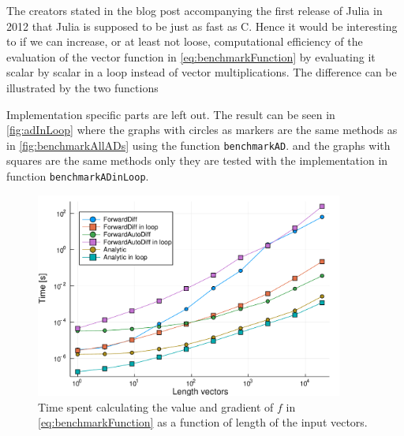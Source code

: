 The creators stated in the blog post accompanying the first release of Julia in 2012 \emph{\citep{juliaBlogRelease2012}} that Julia is supposed to be just as fast as C. Hence it would be interesting to if we can increase, or at least not loose, computational efficiency of the evaluation of the vector function in \eqref{eq:benchmarkFunction} by evaluating it scalar by scalar in a loop instead of vector multiplications. The difference can be illustrated by the two functions

Implementation specific parts are left out. The result can be seen in \autoref{fig:adInLoop} where the graphs with circles as markers are the same methods as in \autoref{fig:benchmarkAllADs} using the function \texttt{benchmarkAD}. and the graphs with squares are the same methods only they are tested with the implementation in function \texttt{benchmarkADinLoop}.
\begin{figure}[htb]
    \centering
    \includegraphics[width = 0.9\textwidth]{figures/benchmark_ad_in_loop.pdf}
    \caption{Time spent calculating the value and gradient of $f$ in \eqref{eq:benchmarkFunction} as                         a function of length of the input vectors. }
    \label{fig:adInLoop}
\end{figure}
